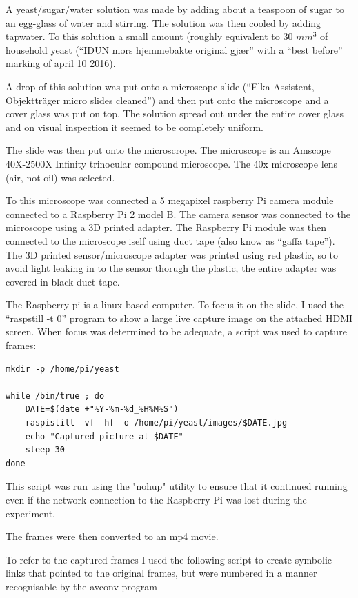 \documentclass[12pt, a4paper]{article}
\begin{document}
A yeast/sugar/water solution was made by adding about a teaspoon of
sugar to an egg-glass of water and stirring.  The solution was then
cooled by adding tapwater.  To this solution a small amount (roughly
equivalent to 30 \(mm^3\) of household yeast (``IDUN mors hjemmebakte
original gjær'' with a ``best before'' marking of april 10 2016).

A drop of this solution was put onto a microscope slide (``Elka
Assistent, Objektträger micro slides  cleaned'') and then put onto the
microscope and a cover glass was put on top.   The solution spread out
under the entire cover glass and on visual inspection it seemed to be
completely uniform.

The slide was then put onto the microscrope.  The microscope is an
Amscope 40X-2500X Infinity  trinocular compound microscope.   The 40x
microscope lens (air, not oil) was selected.   

To this microscope was connected a 5 megapixel raspberry Pi camera
module connected to a Raspberry Pi 2 model B.   The camera sensor was
connected to the microscope using a 3D printed adapter. The Raspberry
Pi module was then connected  to the microscope iself using duct tape
(also know as ``gaffa tape'').  The 3D printed sensor/microscope adapter was
printed using red plastic, so to avoid light leaking in to the sensor
thorugh the plastic, the entire adapter was covered in black duct tape.

The Raspberry pi is a linux based computer.  To focus it on the slide,
I used the ``raspstill -t 0'' program to show a large live capture
image on the attached HDMI screen.   When focus was determined to be
adequate, a script was used to capture frames:

\begin{lstlisting}[frame=single]
mkdir -p /home/pi/yeast

while /bin/true ; do 
    DATE=$(date +"%Y-%m-%d_%H%M%S")
    raspistill -vf -hf -o /home/pi/yeast/images/$DATE.jpg
    echo "Captured picture at $DATE"
    sleep 30
done
\end{lstlisting}

This script was run using the "nohup" utility to ensure that it
continued running even if the network connection to the Raspberry Pi
was lost during the experiment.

The frames were then converted to an mp4 movie.   

To refer to the captured frames I used the following script to create
symbolic links that pointed to the original frames, but were numbered
in a manner recognisable by the avconv program
\end{document}
